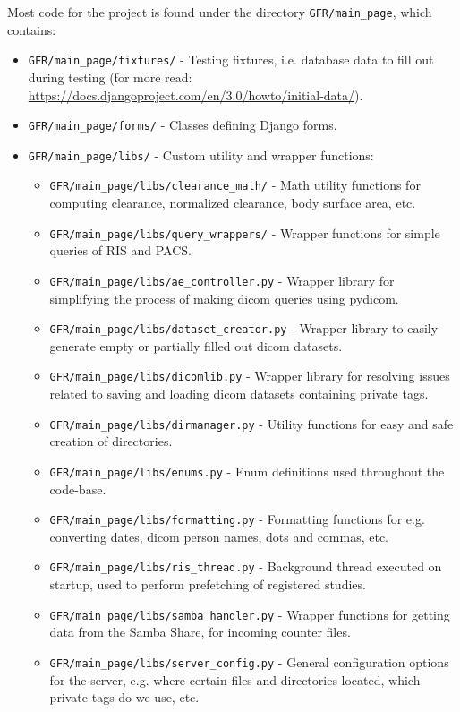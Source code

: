 \documentclass{article}
\begin{document}
Most code for the project is found under the directory \texttt{GFR/main\_page}, which contains:
\begin{itemize}
	\item \texttt{GFR/main\_page/fixtures/} - Testing fixtures, i.e. database data to fill out during testing (for more read: \url{https://docs.djangoproject.com/en/3.0/howto/initial-data/}).
	\item \texttt{GFR/main\_page/forms/} - Classes defining Django forms.
	\item \texttt{GFR/main\_page/libs/} - Custom utility and wrapper functions:
	\begin{itemize}
		\item \texttt{GFR/main\_page/libs/clearance\_math/} - Math utility functions for computing clearance, normalized clearance, body surface area, etc.
		\item \texttt{GFR/main\_page/libs/query\_wrappers/} - Wrapper functions for simple queries of RIS and PACS.
		\item \texttt{GFR/main\_page/libs/ae\_controller.py} - Wrapper library for simplifying the process of making dicom queries using pydicom.
		\item \texttt{GFR/main\_page/libs/dataset\_creator.py} - Wrapper library to easily generate empty or partially filled out dicom datasets.
		\item \texttt{GFR/main\_page/libs/dicomlib.py} - Wrapper library for resolving issues related to saving and loading dicom datasets containing private tags.
		\item \texttt{GFR/main\_page/libs/dirmanager.py} - Utility functions for easy and safe creation of directories.
		\item \texttt{GFR/main\_page/libs/enums.py} - Enum definitions used throughout the code-base.
		\item \texttt{GFR/main\_page/libs/formatting.py} - Formatting functions for e.g. converting dates, dicom person names, dots and commas, etc.
		\item \texttt{GFR/main\_page/libs/ris\_thread.py} - Background thread executed on startup, used to perform prefetching of registered studies.
		\item \texttt{GFR/main\_page/libs/samba\_handler.py} - Wrapper functions for getting data from the Samba Share, for incoming counter files.
		\item \texttt{GFR/main\_page/libs/server\_config.py} - General configuration options for the server, e.g. where certain files and directories located, which private tags do we use, etc.

\end{itemize}
\end{itemize}
\end{document}
